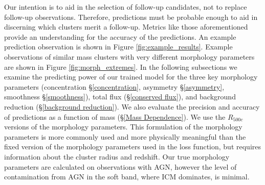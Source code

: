 Our intention is to aid in the selection of follow-up candidates, not to replace follow-up observations. Therefore, predictions must be probable enough to aid in discerning which clusters merit a follow-up. Metrics like those aforementioned provide an understanding for the accuracy of the predictions. An example prediction observation is shown in Figure \ref{fig:example_results}. Example observations of similar mass clusters with very different morphology parameters are shown in Figure \ref{fig:morph_extremes}. In the following subsections we examine the predicting power of our trained model for the three key morphology parameters (concentration \S\ref{concentration}, asymmetry \S\ref{asymmetry}, smoothness \S\ref{smoothness}), total flux (\S\ref{conserved flux}), and background reduction (\S\ref{background reduction}). We also evaluate the precision and accuracy of predictions as a function of mass (\S\ref{Mass Dependence}). We use the $R_{500c}$ versions of the morphology parameters. This formulation of the morphology parameters is more commonly used and more physically meaningful than the fixed version of the morphology parameters used in the loss function, but requires information about the cluster radius and redshift. Our true morphology parameters are calculated on observations with AGN, however the level of contamination from AGN in the soft band, where ICM dominates, is minimal.



